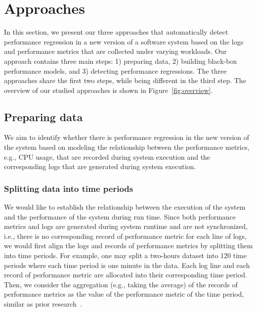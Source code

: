 \section{Approaches} \label{sec:approach}


In this section, we present our three approaches that automatically detect performance regression in a new version of a software system based on the logs and performance metrics that are collected under varying workloads. Our approach contains three main steps: 1) preparing data, 2) building black-box performance models, and 3) detecting performance regressions. The three approaches share the first two steps, while being different in the third step. The overview of our studied approaches is shown in Figure~\ref{fig:overview}.

\subsection{Preparing data}
We aim to identify whether there is performance regression in the new version of the system based on modeling the relationship between the performance metrics, e.g., CPU usage, that are recorded during system execution and the corresponding logs that are generated during system execution. %

\subsubsection{Splitting data into time periods}
We would like to establish the relationship between the execution of the system and the performance of the system during run time. Since both performance metrics and logs are generated during system runtime and are not synchronized, i.e., there is no corresponding record of performance metric for each line of logs, we would first align the logs and records of performance metrics by splitting them into time periods. For example, one may split a  two-hours dataset into 120 time periods where each time period is one minute in the data. Each log line and each record of performance metric are allocated into their corresponding time period. Then, we consider the aggregation (e.g., taking the average) of the records of performance metrics as the value of the performance metric of the time period, similar as prior research~\citep{Foo:2010:MPR:1848650.1849222}. 

